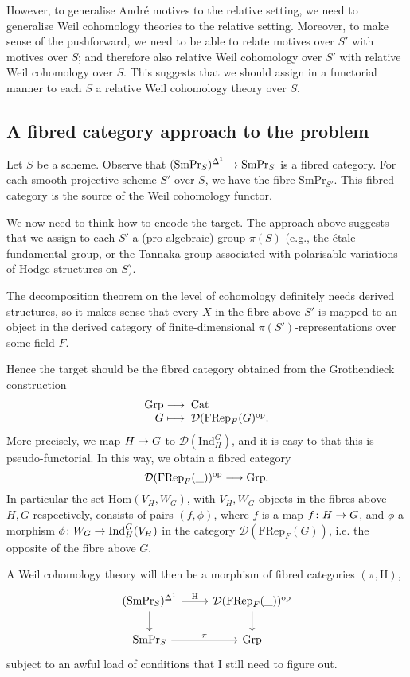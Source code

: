 \documentclass[a4paper,10pt]{article}
\def\smpr{\mathrm{SmPr}}
\def\coh{\mathrm{H}}
\begin{document}
However, to generalise Andr\'{e} motives to the relative setting, we need to
generalise Weil cohomology theories to the relative setting. Moreover, to make
sense of the pushforward, we need to be able to relate motives over $S'$ with
motives over $S$; and therefore also relative Weil cohomology over $S'$ with
relative Weil cohomology over $S$. This suggests that we should assign in a
functorial manner to each $S$ a relative Weil cohomology theory over $S$.

\subsection{A fibred category approach to the problem}

Let $S$ be a scheme. Observe that $\map{(\smpr_{S})^{\Delta^{1}}}{\smpr_{S}}$
is a fibred category. For each smooth projective scheme $S'$ over $S$, we have
the fibre $\smpr_{S'}$. This fibred category is the source of the Weil
cohomology functor.

We now need to think how to encode the target. The approach above suggests that
we assign to each $S'$ a (pro-algebraic) group $\pi(S)$ (e.g., the \'{e}tale
fundamental group, or the Tannaka group associated with polarisable variations
of Hodge structures on $S$).

The decomposition theorem on the level of cohomology definitely needs derived
structures, so it makes sense that every $X$ in the fibre above $S'$ is mapped
to an object in the derived category of finite-dimensional
$\pi(S')$-representations over some field $F$.

Hence the target should be the fibred category obtained from the Grothendieck
construction
\[
	\map{\mathrm{Grp}}{\mathrm{Cat}}%
	[G][\mathcal{D}(\mathrm{FRep}_{F}(G)^{\mathrm{op}}.]
\]
More precisely, we map $\map{H}{G}$ to $\mathcal{D}(\mathrm{Ind}^{G}_{H})$, and
it is easy to that this is pseudo-functorial. In this way, we obtain a fibred
category
\[
	\map{\mathcal{D}(\mathrm{FRep}_{F}(\_))^{\mathrm{op}}}{\mathrm{Grp}}.
\]
In particular the set $\mathrm{Hom}(V_{H},W_{G})$, with $V_{H}, W_{G}$ objects
in the fibres above $H, G$ respectively, consists of pairs $(f, \phi)$, where
$f$ is a map $\map[f]{H}{G}$, and $\phi$ a morphism
$\map[\phi]{W_{G}}{\mathrm{Ind}^{G}_{H}(V_{H})}$ in the category
$\mathcal{D}(\mathrm{FRep}_{F}(G))$, i.e. the opposite of the fibre above $G$.

A Weil cohomology theory will then be a morphism of fibred categories $(\pi,
\coh)$,
\[
	\begin{tikzcd} %
		(\smpr_{S})^{\Delta^{1}} \rar{\coh} \dar &
		\mathcal{D}(\mathrm{FRep}_{F}(\_))^{\mathrm{op}} \dar \\
		\smpr_{S} \rar{\pi} & \mathrm{Grp}
	\end{tikzcd} %
\]
subject to an awful load of conditions that I still need to figure out.
\end{document}
